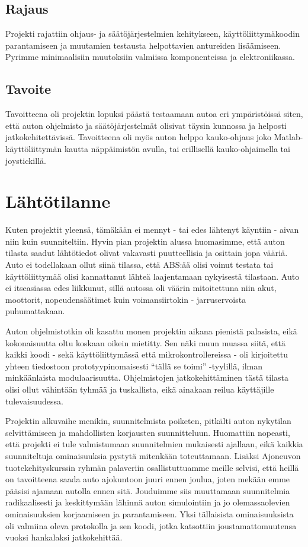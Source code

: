 \documentclass{article}
\begin{document}
\subsection{Rajaus}
Projekti rajattiin ohjaus- ja säätöjärjestelmien kehitykseen, käyttöliittymäkoodin parantamiseen ja muutamien testausta helpottavien antureiden lisäämiseen. Pyrimme minimaalisiin muutoksiin valmiissa komponenteissa ja elektroniikassa.

\subsection{Tavoite}
Tavoitteena oli projektin lopuksi päästä testaamaan autoa eri ympäristöissä siten, että auton ohjelmisto ja säätöjärjestelmät olisivat täysin kunnossa ja helposti jatkokehitettävissä. Tavoitteena oli myös auton helppo kauko-ohjaus joko Matlab-käyttöliittymän kautta näppäimistön avulla, tai erillisellä kauko-ohjaimella tai joystickillä.

\section{Lähtötilanne}
Kuten projektit yleensä, tämäkään ei mennyt - tai edes lähtenyt käyntiin - aivan niin kuin suunniteltiin. Hyvin pian projektin alussa huomasimme, että auton tilasta saadut lähtötiedot olivat vakavasti puutteellisia ja osittain jopa vääriä. Auto ei todellakaan ollut siinä tilassa, että ABS:ää olisi voinut testata tai käyttöliittymää olisi kannattanut lähteä laajentamaan nykyisestä tilastaan. Auto ei itseasiassa edes liikkunut, sillä autossa oli väärin mitoitettuna niin akut, moottorit, nopeudensäätimet kuin voimansiirtokin - jarruservoista puhumattakaan.

Auton ohjelmistotkin oli kasattu monen projektin aikana pienistä palasista, eikä kokonaisuutta oltu koskaan oikein mietitty. Sen näki muun muassa siitä, että kaikki koodi - sekä käyttöliittymässä että mikrokontrollereissa - oli kirjoitettu yhteen tiedostoon prototyypinomaisesti ``tällä se toimi'' -tyylillä, ilman minkäänlaista modulaarisuutta. Ohjelmistojen jatkokehittäminen tästä tilasta olisi ollut vähintään tyhmää ja tuskallista, eikä ainakaan reilua käyttäjille tulevaisuudessa.

Projektin alkuvaihe menikin, suunnitelmista poiketen, pitkälti auton nykytilan selvittämiseen ja mahdollisten korjausten suunnitteluun. Huomattiin nopeasti, että projekti ei tule valmistumaan suunnitelmien mukaisesti ajallaan, eikä kaikkia suunniteltuja ominaisuuksia pystytä mitenkään toteuttamaan. Lisäksi Ajoneuvon tuotekehityskurssin ryhmän palaveriin osallistuttuamme meille selvisi, että heillä on tavoitteena saada auto ajokuntoon juuri ennen joulua, joten mekään emme pääsisi ajamaan autolla ennen sitä. Jouduimme siis muuttamaan suunnitelmia radikaalisesti ja keskittymään lähinnä auton simulointiin ja jo olemassaolevien ominaisuuksien korjaamiseen ja parantamiseen. Yksi tällaisista ominaisuuksista oli valmiina oleva protokolla ja sen koodi, jotka katsottiin joustamattomuutensa vuoksi hankalaksi jatkokehittää.
\end{document}
